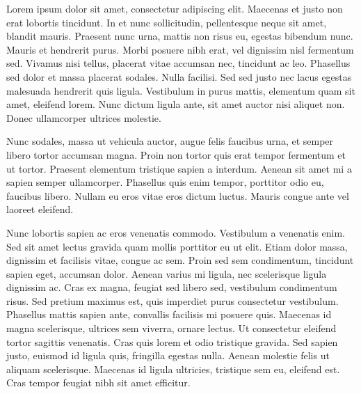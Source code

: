 \documentclass[
]{article}
\begin{document}
Lorem ipsum dolor sit amet, consectetur adipiscing elit. Maecenas et
justo non erat lobortis tincidunt. In et nunc sollicitudin, pellentesque
neque sit amet, blandit mauris. Praesent nunc urna, mattis non risus eu,
egestas bibendum nunc. Mauris et hendrerit purus. Morbi posuere nibh
erat, vel dignissim nisl fermentum sed. Vivamus nisi tellus, placerat
vitae accumsan nec, tincidunt ac leo. Phasellus sed dolor et massa
placerat sodales. Nulla facilisi. Sed sed justo nec lacus egestas
malesuada hendrerit quis ligula. Vestibulum in purus mattis, elementum
quam sit amet, eleifend lorem. Nunc dictum ligula ante, sit amet auctor
nisi aliquet non. Donec ullamcorper ultrices molestie.

Nunc sodales, massa ut vehicula auctor, augue felis faucibus urna, et
semper libero tortor accumsan magna. Proin non tortor quis erat tempor
fermentum et ut tortor. Praesent elementum tristique sapien a interdum.
Aenean sit amet mi a sapien semper ullamcorper. Phasellus quis enim
tempor, porttitor odio eu, faucibus libero. Nullam eu eros vitae eros
dictum luctus. Mauris congue ante vel laoreet eleifend.

Nunc lobortis sapien ac eros venenatis commodo. Vestibulum a venenatis
enim. Sed sit amet lectus gravida quam mollis porttitor eu ut elit.
Etiam dolor massa, dignissim et facilisis vitae, congue ac sem. Proin
sed sem condimentum, tincidunt sapien eget, accumsan dolor. Aenean
varius mi ligula, nec scelerisque ligula dignissim ac. Cras ex magna,
feugiat sed libero sed, vestibulum condimentum risus. Sed pretium
maximus est, quis imperdiet purus consectetur vestibulum. Phasellus
mattis sapien ante, convallis facilisis mi posuere quis. Maecenas id
magna scelerisque, ultrices sem viverra, ornare lectus. Ut consectetur
eleifend tortor sagittis venenatis. Cras quis lorem et odio tristique
gravida. Sed sapien justo, euismod id ligula quis, fringilla egestas
nulla. Aenean molestie felis ut aliquam scelerisque. Maecenas id ligula
ultricies, tristique sem eu, eleifend est. Cras tempor feugiat nibh sit
amet efficitur.

 
  \providecommand{\huxb}[2]{\arrayrulecolor[RGB]{#1}\global\arrayrulewidth=#2pt}
  \providecommand{\huxvb}[2]{\color[RGB]{#1}\vrule width #2pt}
  \providecommand{\huxtpad}[1]{\rule{0pt}{#1}}
  \providecommand{\huxbpad}[1]{\rule[-#1]{0pt}{#1}}
\end{document}

